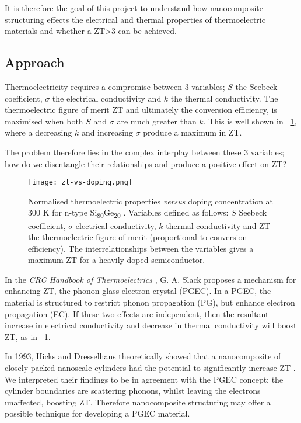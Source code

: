 \documentclass[12pt,draft]{article}
\newcommand{\figref}[2][\figurename~]{#1\ref{#2}}
\begin{document}
It is therefore the goal of this project to understand how nanocomposite structuring effects the electrical and thermal properties of thermoelectric materials and whether a ZT\textgreater3 can be achieved.

\subsection{Approach}
Thermoelectricity requires a compromise between 3 variables; $S$ the Seebeck coefficient, $\sigma$ the electrical conductivity and $k$ the thermal conductivity. The thermoelectric figure of merit ZT and ultimately the conversion efficiency, is maximised when both $S$ and $\sigma$ are much greater than $k$. This is well shown in \figref{fig:zt-vs-doping}, where a decreasing $k$ and increasing $\sigma$ produce a maximum in ZT.

The problem therefore lies in the complex interplay between these 3 variables; how do we disentangle their relationships and produce a positive effect on ZT?

\begin{figure}
	\centering
	\texttt{[image: zt-vs-doping.png]}
	\caption{Normalised thermoelectric properties \emph{versus} doping concentration at 300 K for n-type Si\textsubscript{80}Ge\textsubscript{20} \cite{minnich-review}. Variables defined as follows: $S$ Seebeck coefficient, $\sigma$ electrical conductivity, $k$ thermal conductivity and ZT the thermoelectric figure of merit (proportional to conversion efficiency). The interrelationships between the variables gives a maximum ZT for a heavily doped semiconductor.}
	\label{fig:zt-vs-doping}
\end{figure}

In the \emph{CRC Handbook of Thermoelectrics} \cite{crc-handbook}, G. A. Slack proposes a mechanism for enhancing ZT, the phonon glass electron crystal (PGEC). In a PGEC, the material is structured to restrict phonon propagation (PG), but enhance electron propagation (EC). If these two effects are independent, then the resultant increase in electrical conductivity and decrease in thermal conductivity will boost ZT, as in \figref{fig:zt-vs-doping}.

In 1993, Hicks and Dresselhaus theoretically showed that a nanocomposite of closely packed nanoscale cylinders had the potential to significantly increase ZT \cite{nanowires}. We interpreted their findings to be in agreement with the PGEC concept; the cylinder boundaries are scattering phonons, whilst leaving the electrons unaffected, boosting ZT. Therefore nanocomposite structuring may offer a possible technique for developing a PGEC material.
\end{document}
